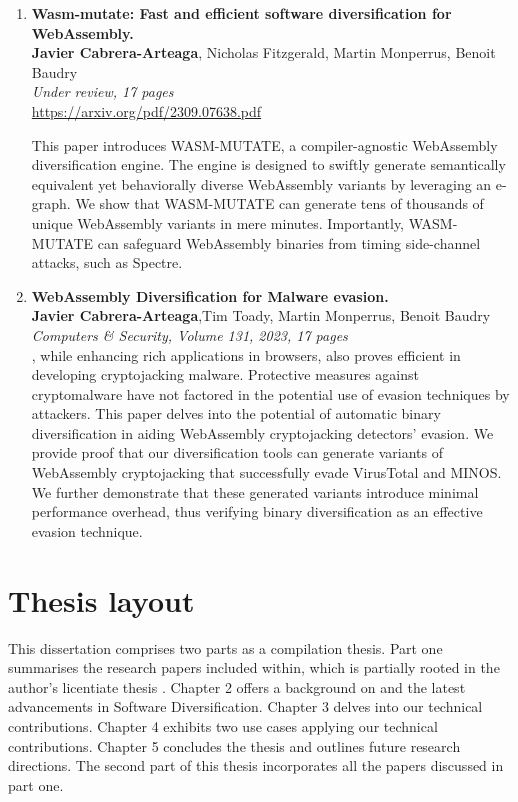 \begin{enumerate}[label={\textbf{P\arabic*}:}, ref={P\arabic*}]
	
	\item \label{wasmmutatepaper}\textbf{Wasm-mutate: Fast and efficient software diversification for WebAssembly. }\\ 
	\textbf{Javier Cabrera-Arteaga}, Nicholas Fitzgerald, Martin Monperrus, Benoit Baudry\\
	\textit{Under review, 17 pages} \\
	\url{https://arxiv.org/pdf/2309.07638.pdf}    

	This paper introduces WASM-MUTATE, a compiler-agnostic WebAssembly diversification engine. 
	The engine is designed to swiftly generate semantically equivalent yet behaviorally diverse WebAssembly variants by leveraging an e-graph. 
	We show that WASM-MUTATE can generate tens of thousands of unique WebAssembly variants in mere minutes. 
	Importantly, WASM-MUTATE can safeguard WebAssembly binaries from timing side-channel attacks, such as Spectre.



	\item \label{evasionpaper} \textbf{WebAssembly Diversification for Malware evasion.} \\ 
	\textbf{Javier Cabrera-Arteaga},Tim Toady, Martin Monperrus, Benoit Baudry\\
	\textit{Computers \& Security, Volume 131, 2023, 17 pages} \\
	  \Wasm, while enhancing rich applications in browsers, also proves efficient in developing cryptojacking malware. 
	Protective measures against cryptomalware have not factored in the potential use of evasion techniques by attackers. 
	This paper delves into the potential of automatic binary diversification in aiding WebAssembly cryptojacking detectors' evasion. 
	We provide proof that our diversification tools can generate variants of WebAssembly cryptojacking that successfully evade VirusTotal and MINOS. 
	We further demonstrate that these generated variants introduce minimal performance overhead, thus verifying binary diversification as an effective evasion technique.

\end{enumerate}



\section*{Thesis layout}
This dissertation comprises two parts as a compilation thesis. 
Part one summarises the research papers included within, which is partially rooted in the author's licentiate thesis \cite{Lic}. 
Chapter 2 offers a background on \Wasm and the latest advancements in Software Diversification. 
Chapter 3 delves into our technical contributions. 
Chapter 4 exhibits two use cases applying our technical contributions. 
Chapter 5 concludes the thesis and outlines future research directions. 
The second part of this thesis incorporates all the papers discussed in part one.

